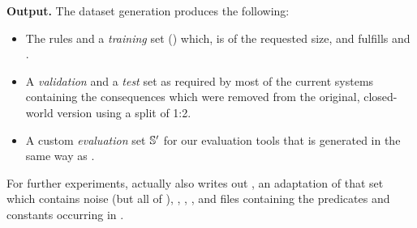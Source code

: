 \textbf{Output.}
The dataset generation produces the following:
\begin{itemize}
\item The rules and a \emph{training} set (\dbowan) which, is of the requested size, and fulfills \nowa and \nnoise.
\item A \emph{validation} and a \emph{test} set as required by most of the current systems containing the consequences which were removed from the original, closed-world version \db using a split of 1:2. 
\item %
A custom \emph{evaluation} set $\mathbb{S}'$ for our evaluation tools that is
generated in the same way as \sfacts.
\end{itemize}
For further experiments, \tool actually 
also writes out
\db, an adaptation of that set which contains noise (but all of \cfacts), \dbowa, \sfacts, \cfacts, and files containing the predicates and constants occurring in \db.

